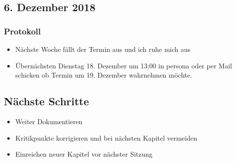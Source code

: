 \documentclass{article}
\begin{document}
    
\subsection{6. Dezember 2018} \label{chap:Protokols:5dec2018}

\subsubsection{Protokoll}
\begin{itemize}
    \item Nächste Woche fällt der Termin aus und ich ruhe mich aus
    \item Übernächsten Dienstag 18. Dezember um 13:00 in persona oder per Mail schicken ob Termin um 19. Dezember wahrnehmen möchte.
\end{itemize}
\subsection{Nächste Schritte}
\begin{itemize}
    \item Weiter Dokumentieren
    \item Kritikpunkte korrigieren und bei nächsten Kapitel vermeiden
    \item Einreichen neuer Kapitel vor nächster Sitzung
\end{itemize}
\end{document}
